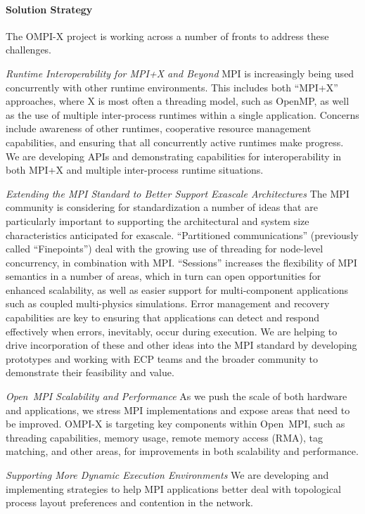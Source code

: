 \paragraph{Solution Strategy}
The OMPI-X project is working across a number of fronts to address
these challenges.

\emph{Runtime Interoperability for MPI+X and Beyond} MPI is
increasingly being used concurrently with other runtime environments.
This includes both ``MPI+X'' approaches, where X
is most often a threading model, such as OpenMP, as
well as the use of multiple inter-process runtimes within a single
application.  Concerns include awareness of other runtimes,
cooperative resource management capabilities, and ensuring that all
concurrently active runtimes make progress.  We are developing APIs and
demonstrating capabilities for interoperability in both MPI+X and
multiple inter-process runtime situations.

\emph{Extending the MPI Standard to Better Support Exascale
Architectures} The MPI community is considering for standardization a
number of ideas that
are particularly important to supporting
the architectural and system size characteristics anticipated for
exascale.  ``Partitioned communications'' (previously called ``Finepoints'')
deal with the growing use of threading for node-level concurrency, in
combination with MPI.  ``Sessions'' increases the flexibility of MPI
semantics in a number of areas, which in turn can open opportunities
for enhanced scalability, as well as easier support for
multi-component applications such as coupled multi-physics
simulations. Error management and recovery capabilities are key to
ensuring that applications can detect and respond effectively when errors,
inevitably, occur during execution.  We are helping to drive incorporation
of these and other ideas into the MPI standard by developing prototypes and
working with ECP teams and the broader community to demonstrate their
feasibility and value.

\emph{Open~MPI Scalability and Performance} As we push the scale of
both hardware and applications, we stress MPI implementations and
expose areas that need to be improved.
OMPI-X is targeting key components within Open~MPI, such as threading capabilities,
memory usage, remote memory access (RMA), tag matching, and other areas,
for improvements in both scalability and performance.

\emph{Supporting More Dynamic Execution Environments} We are
developing and implementing strategies to help MPI applications
better deal with topological process layout preferences
and contention in the network.

